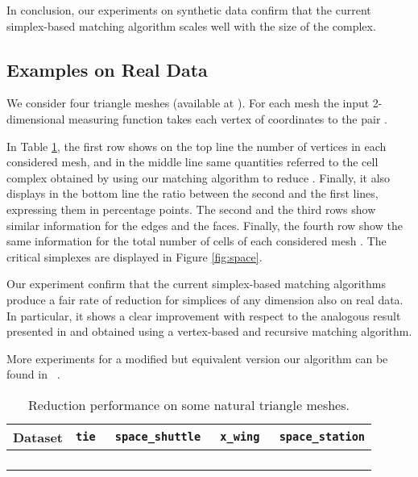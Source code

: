 \documentclass[12pt]{article}
\begin{document}
In conclusion, our experiments on synthetic data confirm that the current simplex-based matching algorithm scales well with the size of the complex.

\subsection{Examples on Real Data}
We consider four triangle meshes (available at \cite{sf}).
For each mesh the input  2-dimensional measuring function 
takes each vertex  of coordinates  to the pair .

In Table \ref{tab:space}, the first row shows on the top line the number of vertices in each considered mesh, and in
the middle line same quantities referred to the cell complex 
obtained by using our matching algorithm to reduce . Finally, it also displays in the bottom line the ratio between
the second and the first lines, expressing them in percentage points.
The second and the third rows show similar information for the edges and the faces. Finally, the fourth row show the same
information for the total number of cells of each considered mesh . The critical simplexes are displayed in Figure \ref{fig:space}.


Our experiment confirm that the current simplex-based matching algorithms produce a fair rate of reduction for simplices of any dimension also on real data. In particular, it shows a clear improvement with respect to the analogous result presented in \cite{AlKaLa17} and obtained using a vertex-based and recursive matching algorithm.


More experiments for a modified but equivalent version our algorithm can be found in ~\cite{Iur16}.

\begin{table}
\caption{Reduction performance on some natural triangle meshes.}
\begin{tabular}{| c | c | c | c | c |}
\hline
Dataset & \tt{tie} & \tt{space\_shuttle} & \tt{x\_wing} & \tt{space\_station}\\
 \hline
&
&
 &
&
 \\
 \hline
  &
 &
  &
  &
  \\
 \hline
  &
  &
 &
  &
  \\
 \hline
   &
  &
  &
  &
 \\
 \hline
 \end{tabular}
\label{tab:space}
\end{table}
\end{document}
